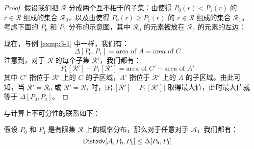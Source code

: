 \begin{proof}
假设我们把 $\mathcal{R}$ 分成两个互不相干的子集：由使得 $P_0(r)<P_1(r)$ 的 $r\in\mathcal R$ 组成的集合 $\mathcal{R}_0$，以及由使得 $P_0(r)\geq P_1(r)$ 的 $r\in\mathcal R$ 组成的集合 $\mathcal{R}_1$。考虑下面的 $P_0$ 和 $P_1$ 分布的示意图，其中 $\mathcal{R}_0$ 的元素被放在 $\mathcal{R}_1$ 的元素的左边：

\begin{figure*}[h!]
  \centering
  
\end{figure*}

现在，与例 \ref{exmp:3-1} 中一样，我们有：
\[
\Delta[P_0,P_1]=\text{area of } A = \text{area of } C
\]
注意到，对于 $\mathcal{R}$ 的每个子集 $\mathcal{R}'$，我们都有：
\[
P_0[\mathcal{R}']-P_1[\mathcal{R}']=\text{area of } C' - \text{area of } A'
\]
其中 $C'$ 指位于 $\mathcal{R}'$ 上的 $C$ 的子区域，$A'$ 指位于 $\mathcal{R}'$ 上的 $A$ 的子区域。由此可知，当 $\mathcal{R}'=\mathcal{R}_0$ 或 $\mathcal{R}'=\mathcal{R}_1$ 时，$|P_0[\mathcal{R}']-P_1[\mathcal{R}']|$ 取得最大值，此时最大值就等于 $\Delta[P_0,P_1]$。
\end{proof}

与计算上不可分性的联系如下：

\begin{theorem}\label{theo:3-11}
假设 $P_0$ 和 $P_1$ 是有限集 $\mathcal{R}$ 上的概率分布，那么对于任意对手 $\mathcal A$，我们都有：
\[
{\rm Dist\mathsf{adv}}[\mathcal{A},P_0,P_1]\leq\Delta[P_0,P_1]
\]
\end{theorem}

